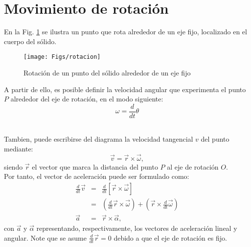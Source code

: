\section*{Movimiento de rotación}
\noindent En la Fig. \ref{rotacion} se ilustra un punto que rota alrededor de un eje fijo, localizado en el cuerpo del sólido.\\
\begin{figure}[h]
\centering
\texttt{[image: Figs/rotacion]}
\caption[]{Rotación de un punto del sólido alrededor de un eje fijo}\label{rotacion}
\end{figure}

A partir de ello, es posible definir la velocidad angular que experimenta el punto $P$ alrededor del eje de rotación, en el modo siguiente:
\begin{equation}
\omega = \frac{d}{dt}\theta
\end{equation}\

Tambien, puede escribirse del diagrama la velocidad tangencial $v$ del punto mediante:
\begin{equation}
\vec{v} = \vec{r} \times \vec{\omega},
\end{equation}
siendo $\vec{r}$ el vector que marca la distancia del punto $P$ al eje de rotación $O$.\\

Por tanto, el vector de aceleración puede ser formulado como:
\begin{eqnarray}\label{aceler}
\nonumber \frac{d}{dt}\vec{v} & = & \frac{d}{dt}[\vec{r} \times \vec{\omega}]\\
\nonumber & = & \left( \frac{d}{dt}\vec{r}\times \vec{\omega}\right) + \left( \vec{r}\times \frac{d}{dt}\vec{\omega}\right)\\
\vec{a}   & = & \vec{r} \times \vec{\alpha},
\end{eqnarray}
con $\vec{a}$ y $\vec{\alpha}$ representando, respectivamente, los vectores de aceleración lineal y angular. Note que se asume $\frac{d}{dt}\vec{r} = 0$ debido a que el eje de rotación es fijo.

